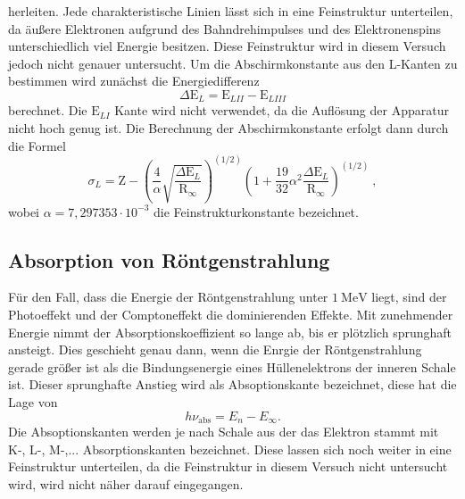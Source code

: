 herleiten.
Jede charakteristische Linien lässt sich in eine Feinstruktur unterteilen, da
äußere Elektronen aufgrund des Bahndrehimpulses und des Elektronenspins unterschiedlich
viel Energie besitzen. Diese Feinstruktur wird in diesem Versuch jedoch nicht genauer
untersucht.
Um die Abschirmkonstante aus den L-Kanten zu bestimmen wird zunächst die Energiedifferenz
\begin{equation}
  \Delta \text{E}_L = \text{E}_{LII} - \text{E}_{LIII}
\end{equation}
berechnet. Die $\text{E}_{LI}$ Kante wird nicht verwendet, da die Auflösung der
Apparatur nicht hoch genug ist.
Die Berechnung der Abschirmkonstante erfolgt dann durch die Formel
\begin{equation}
  \sigma_L = \text{Z} - \left(\frac{4}{\alpha}\sqrt{\frac{\Delta\text{E}_L}{\text{R}_{\infty}}} \right)^{(1/2)}
  \left(1+\frac{19}{32}\alpha^2\frac{\Delta\text{E}_L}{\text{R}_\infty}\right)^{(1/2)} \: ,
  \label{eqn:L}
\end{equation}
wobei $\alpha=7,297353 \cdot 10^{-3}$ die Feinstrukturkonstante bezeichnet.

\subsection{Absorption von Röntgenstrahlung}
Für den Fall, dass die Energie der Röntgenstrahlung unter $\SI{1}{\mega\electronvolt}$ liegt,
sind der Photoeffekt und der Comptoneffekt die dominierenden Effekte.
Mit zunehmender Energie nimmt der Absorptionskoeffizient so lange ab, bis
er plötzlich sprunghaft ansteigt. Dies geschieht genau dann, wenn die Enrgie der
Röntgenstrahlung gerade größer ist als die Bindungsenergie eines Hüllenelektrons
der inneren Schale ist.
Dieser sprunghafte Anstieg wird als Absoptionskante bezeichnet, diese hat die Lage von
\begin{equation}
  h\nu_{\text{abs}}=E_n - E_{\infty}.
\end{equation}
Die Absoptionskanten werden je nach Schale aus der das Elektron stammt mit
K-, L-, M-,... Absorptionskanten bezeichnet. Diese lassen sich noch weiter in
eine Feinstruktur unterteilen, da die Feinstruktur in diesem Versuch nicht untersucht wird,
wird nicht näher darauf eingegangen.

